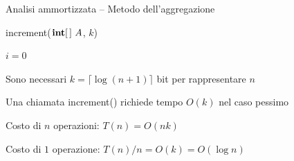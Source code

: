 \begin{frame}{Analisi ammortizzata -- Metodo dell'aggregazione}


\bigskip
\begin{overprint}
\begin{Procedure}
\caption[A]{\textsf{increment}($\INTARRAY\ A$, \INTEGER $k$)}
\INTEGER $i = 0$\;
\end{Procedure}
\begin{myboxtitle}
\BIL
\item Sono necessari \alert{$k = \lceil \log (n+1) \rceil$} bit per rappresentare $n$
\item Una chiamata \textsf{increment}() richiede tempo $O(k)$ nel caso pessimo 
\item Costo di $n$ operazioni: \alert{$T(n) = O(nk)$}
\item Costo di $1$ operazione: \alert{$T(n)/n = O(k) = O(\log n)$}
\EIL
\end{myboxtitle}
\end{overprint}

\end{frame}

